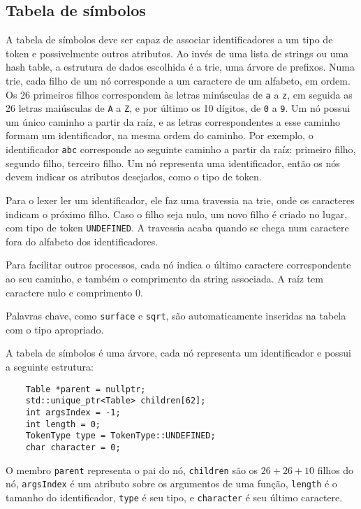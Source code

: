 \documentclass[10pt,a4paper]{article}
\begin{document}
\subsection{Tabela de símbolos}
A tabela de símbolos deve ser capaz de associar identificadores a um tipo de token e possivelmente outros atributos.
Ao invés de uma lista de strings ou uma hash table, a estrutura de dados escolhida é a trie, uma árvore de prefixos.
Numa trie, cada filho de um nó corresponde a um caractere de um alfabeto, em ordem.
Os 26 primeiros filhos correspondem às letras minúsculas de \texttt{a} a \texttt{z},
em seguida as 26 letras maiúsculas de \texttt{A} a \texttt{Z}, e por último os 10 dígitos,
de \texttt{0} a \texttt{9}. Um nó possui um único caminho a partir da raíz, 
e as letras correspondentes a esse caminho formam um identificador, na mesma ordem do caminho.
Por exemplo, o identificador \texttt{abc} corresponde ao seguinte caminho a partir da raíz:
primeiro filho, segundo filho, terceiro filho. Um nó representa uma identificador,
então os nós devem indicar os atributos desejados, como o tipo de token.

Para o lexer ler um identificador, ele faz uma travessia na trie, onde os caracteres indicam o próximo filho.
Caso o filho seja nulo, um novo filho é criado no lugar, com tipo de token \texttt{UNDEFINED}.
A travessia acaba quando se chega num caractere fora do alfabeto dos identificadores.

Para facilitar outros processos, cada nó indica o último caractere correspondente ao seu caminho,
e também o comprimento da string associada. A raíz tem caractere nulo e comprimento 0.

Palavras chave, como \texttt{surface} e \texttt{sqrt}, são automaticamente inseridas na tabela com o tipo apropriado.

A tabela de símbolos é uma árvore, cada nó representa um identificador e possui a seguinte estrutura:
\begin{verbatim}
	Table *parent = nullptr;
	std::unique_ptr<Table> children[62];
	int argsIndex = -1;
	int length = 0;
	TokenType type = TokenType::UNDEFINED;
	char character = 0;
\end{verbatim}

O membro \texttt{parent} representa o pai do nó, \texttt{children} são os $26+26+10$ filhos do nó,
\texttt{argsIndex} é um atributo sobre os argumentos de uma função,
\texttt{length} é o tamanho do identificador, \texttt{type} é seu tipo, e \texttt{character} é seu último caractere.
\end{document}
